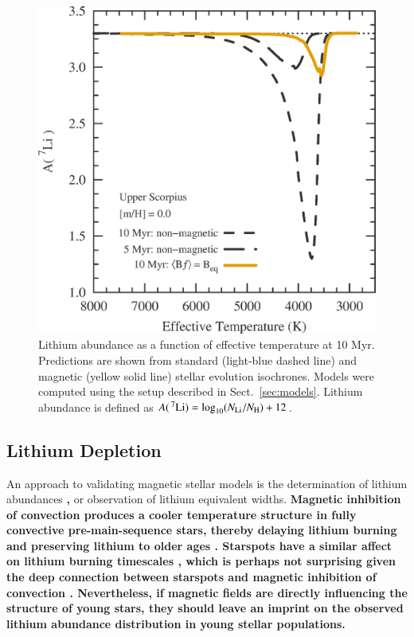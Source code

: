 \documentclass{aa}
\begin{document}
\begin{figure}[t]
    \includegraphics[width=0.85\linewidth]{Li7_USco_Beq.eps}
    \caption{Lithium abundance  as a function of effective temperature at 10 Myr. Predictions are shown from standard (light-blue dashed line) and magnetic (yellow solid line) stellar evolution isochrones. Models were computed using the setup described in Sect.~\ref{sec:models}. Lithium abundance is defined as $A(\,^7{\rm Li}) = \log_{10}(N_{\rm Li}/N_{\rm H}) + 12$.}
    \label{fig:lithium}
\end{figure}

\subsection{Lithium Depletion}
An approach to validating magnetic stellar models is the determination of lithium abundances {\bf \citep{MacDonald2015},} or observation of lithium equivalent widths. {\bf Magnetic inhibition of convection produces a cooler temperature structure in fully convective pre-main-sequence stars, thereby delaying lithium burning and preserving lithium to older ages \citep{Ventura1998, DAntona2000, MM10, FC13, Malo2014, MacDonald2015}. Starspots have a similar affect on lithium burning timescales \citep{Jackson2014b, Somers2015b}, which is perhaps not surprising given the deep connection between starspots and magnetic inhibition of convection \citep{Biermann1941, Deinzer1965}. Nevertheless, if magnetic fields are directly influencing the structure of young stars, they should leave an imprint on the observed lithium abundance distribution in young stellar populations.}
 
\end{document}
